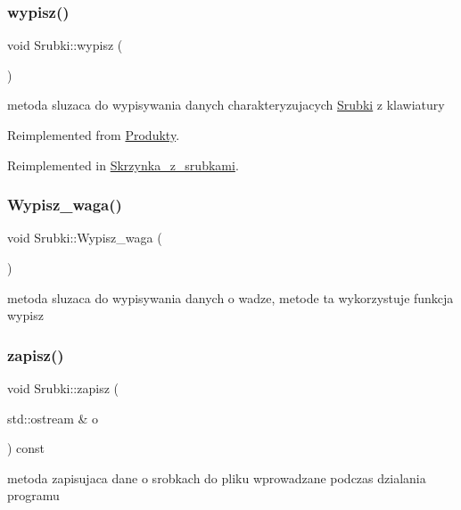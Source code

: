 \subsubsection{\texorpdfstring{wypisz()}{wypisz()}}
{\footnotesize\ttfamily void Srubki\+::wypisz (\begin{DoxyParamCaption}{ }\end{DoxyParamCaption})\hspace{0.3cm}{\ttfamily [virtual]}}

metoda sluzaca do wypisywania danych charakteryzujacych \mbox{\hyperlink{class_srubki}{Srubki}} z klawiatury 

Reimplemented from \mbox{\hyperlink{class_produkty_a720c6591cfbb332f99baccf0f54c4ada}{Produkty}}.



Reimplemented in \mbox{\hyperlink{class_skrzynka__z__srubkami_ac543a438ce88bc79a9e8a398b6beff7c}{Skrzynka\+\_\+z\+\_\+srubkami}}.

\mbox{\label{class_srubki_a63a36d27654a13af2f8223ac28b3eae3}} 
\subsubsection{\texorpdfstring{Wypisz\+\_\+waga()}{Wypisz\_waga()}}
{\footnotesize\ttfamily void Srubki\+::\+Wypisz\+\_\+waga (\begin{DoxyParamCaption}{ }\end{DoxyParamCaption})}

metoda sluzaca do wypisywania danych o wadze, metode ta wykorzystuje funkcja wypisz \mbox{\label{class_srubki_a2d8edbd9d8170f12378c750f634a7ecd}} 
\subsubsection{\texorpdfstring{zapisz()}{zapisz()}}
{\footnotesize\ttfamily void Srubki\+::zapisz (\begin{DoxyParamCaption}\item[{std\+::ostream \&}]{o }\end{DoxyParamCaption}) const\hspace{0.3cm}{\ttfamily [virtual]}}

metoda zapisujaca dane o srobkach do pliku wprowadzane podczas dzialania programu 

